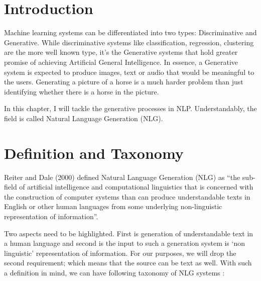\documentclass[]{krantz}
\begin{document}
\hypertarget{introduction}{%
\section{Introduction}\label{introduction}}

Machine learning systems can be differentiated into two types: Discriminative and Generative. While discriminative systems like classification, regression, clustering are the more well known type, it's the Generative systems that hold greater promise of achieving Artificial General Intelligence. In essence, a Generative system is expected to produce images, text or audio that would be meaningful to the users. Generating a picture of a horse is a much harder problem than just identifying whether there is a horse in the picture.

In this chapter, I will tackle the generative processes in NLP. Understandably, the field is called Natural Language Generation (NLG).

\hypertarget{definition-and-taxonomy}{%
\section{Definition and Taxonomy}\label{definition-and-taxonomy}}

Reiter and Dale (2000) defined Natural Language Generation (NLG) as ``the sub-field of artificial intelligence and computational linguistics that is concerned with the construction of computer systems than can produce understandable texts in English or other human languages from some underlying non-linguistic representation of information''.

Two aspects need to be highlighted. First is generation of understandable text in a human language and second is the input to such a generation system is `non linguistic' representation of information. For our purposes, we will drop the second requirement; which means that the source can be text as well. With such a definition in mind, we can have following taxonomy of NLG systems :
\end{document}
